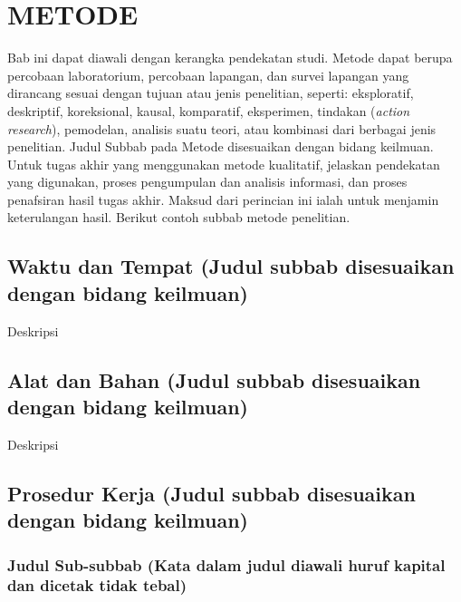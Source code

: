 
\chapter{METODE}

Bab ini dapat diawali dengan kerangka pendekatan studi. Metode dapat berupa
percobaan laboratorium, percobaan lapangan, dan survei lapangan yang dirancang
sesuai dengan tujuan atau jenis penelitian, seperti: eksploratif, deskriptif,
koreksional, kausal, komparatif, eksperimen, tindakan
(\textit{action research}), pemodelan, analisis suatu teori, atau kombinasi
dari berbagai jenis penelitian. Judul Subbab pada Metode disesuaikan dengan
bidang keilmuan. Untuk tugas akhir yang menggunakan metode kualitatif, jelaskan
pendekatan yang digunakan, proses pengumpulan dan analisis informasi, dan
proses penafsiran hasil tugas akhir. Maksud dari perincian ini ialah untuk
menjamin keterulangan hasil. Berikut contoh subbab metode penelitian.

\section[Waktu dan Tempat]{Waktu dan Tempat (Judul subbab disesuaikan dengan bidang keilmuan)}

Deskripsi\dotfill

\noindent\dotfill

\noindent\dotfill

\section[Alat dan Bahan]{Alat dan Bahan (Judul subbab disesuaikan dengan bidang keilmuan)}

Deskripsi\dotfill

\noindent\dotfill

\noindent\dotfill

\section[Prosedur Kerja]{Prosedur Kerja (Judul subbab disesuaikan dengan bidang keilmuan)}

\subsection{Judul Sub-subbab (Kata dalam judul diawali huruf kapital dan dicetak tidak tebal)}

